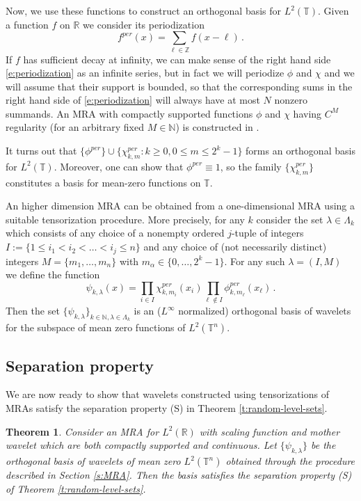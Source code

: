 \documentclass[11pt,reqno]{amsart}
\newcommand{\Z}{{\mathbb Z}}
\newtheorem{theorem}{Theorem}[section]
\theoremstyle{definition}
\numberwithin{equation}{section}
\begin{document}
Now, we use these functions to construct an orthogonal basis for $L^2(\mathbb T)$. Given a function $f$ on $\mathbb R$ we consider its periodization 
\begin{equation}\label{e:periodization}
f^{per}(x)=\sum_{\ell\in\Z}f(x-\ell)\, .
\end{equation}
If $f$ has sufficient decay at infinity, we can make sense of the right hand side \eqref{e:periodization} as an infinite series, but in fact we will periodize $\phi$ and $\chi$ and we will assume that their support is bounded, so that the corresponding sums in the right hand side of \eqref{e:periodization} will always have at most $N$ nonzero summands. An MRA with compactly supported functions $\phi$ and $\chi$ having $C^M$ regularity (for an arbitrary fixed $M\in \mathbb N$) is constructed in \cite{Dau88}.

It turns out that $\{\phi^{per}\}\cup\{\chi^{per}_{k,m}:k\ge 0, 0\le m\le 2^k-1\}$ forms an orthogonal basis for $L^2(\mathbb T)$. Moreover, one can show that $\phi^{per}\equiv 1$, so the family $\{\chi^{per}_{k,m}\}$ constitutes a basis for mean-zero functions on $\mathbb T$.

An higher dimension MRA can be obtained from a one-dimensional MRA using a suitable tensorization procedure. More precisely, for any $k$ consider the set $\lambda \in \Lambda_k$ which consists of any choice of a nonempty ordered $j$-tuple of integers $I :=\{1\leq i_1 < i_2 < \ldots < i_j \leq n\}$ and any choice of (not necessarily distinct) integers $M = \{m_1, \ldots , m_n\}$ with $m_\alpha \in \{0, \ldots, 2^k-1\}$. For any such $\lambda = (I, M)$ we define the function
\[
\psi_{k, \lambda} (x) = \prod_{i \in I} \chi^{per}_{k,m_i} (x_i) \prod_{\ell\not\in I} \phi^{per}_{k, m_\ell} (x_\ell)\, .
\]
Then the set $\{\psi_{k, \lambda}\}_{k\in \mathbb N, \lambda\in \Lambda_k}$ is an ($L^\infty$ normalized) orthogonal basis of wavelets for the subspace of mean zero functions of $L^2 (\mathbb T^n)$. 

\subsection{Separation property} We are now ready to show that wavelets constructed using tensorizations of MRAs satisfy the separation property (S) in Theorem \ref{t:random-level-sets}. 

\begin{theorem}\label{t:separation}
Consider an MRA for $L^2 (\mathbb R)$ with scaling function and mother wavelet which are both compactly supported and continuous. Let $\{\psi_{k, \lambda}\}$ be the orthogonal basis of wavelets of mean zero $L^2 (\mathbb T^n)$ obtained through the procedure described in Section \ref{s:MRA}. Then the basis satisfies the separation property (S) of Theorem \ref{t:random-level-sets}.
\end{theorem}
\end{document}
